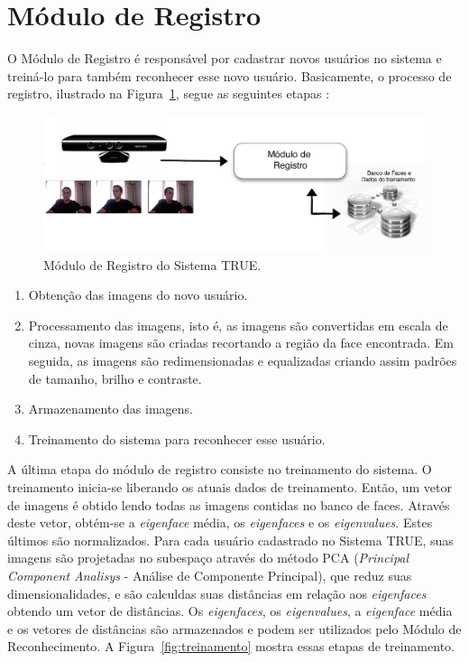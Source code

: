\section{Módulo de Registro}

	O Módulo de Registro é responsável por cadastrar novos usuários no sistema e treiná-lo para também reconhecer esse novo usuário. Basicamente, o processo de registro, ilustrado na Figura~\ref{fig:registro}, segue as seguintes etapas :

		\begin{figure}[htb]
			\begin{center}
				\includegraphics[scale=1.5]{figuras/4.ProblemaEProposta/registro.png}
			\end{center}
			\caption{Módulo de Registro do Sistema TRUE.}
			\label{fig:registro}
		\end{figure}		

		\begin{enumerate}
			\item Obtenção das imagens do novo usuário.
			\item Processamento das imagens, isto é, as imagens são convertidas em escala de cinza, novas imagens são criadas recortando a região da face encontrada. Em seguida, as imagens são redimensionadas e equalizadas criando assim padrões de tamanho, brilho e contraste.
			\item Armazenamento das imagens.
			\item Treinamento do sistema para reconhecer esse usuário.
		\end{enumerate}

	A última etapa do módulo de registro consiste no treinamento do sistema. O treinamento inicia-se liberando os atuais dados de treinamento. Então, um vetor de imagens é obtido lendo todas as imagens contidas no banco de faces. Através deste vetor, obtém-se a \textit{eigenface} média, os \textit{eigenfaces} e os \textit{eigenvalues}. Estes últimos são normalizados. Para cada usuário cadastrado no Sistema TRUE, suas imagens são projetadas no subespaço através do método PCA (\textit{Principal Component Analisys} - Análise de Componente Principal), que reduz suas dimensionalidades, e são calculdas suas distâncias em relação aos \textit{eigenfaces} obtendo um vetor de distâncias. Os \textit{eigenfaces}, os \textit{eigenvalues}, a \textit{eigenface} média e os vetores de distâncias são armazenados e podem ser utilizados pelo Módulo de Reconhecimento. A Figura~\ref{fig:treinamento} mostra essas etapas de treinamento.

